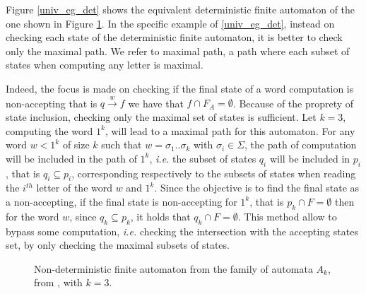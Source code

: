\documentclass[letterpaper]{article}
\theoremstyle{definition}
\begin{document}
Figure \ref{univ_eg_det} shows the equivalent deterministic finite
automaton of the one
shown in Figure \ref{univ_eg_nondet}.
In the specific example of \ref{univ_eg_det}, instead on checking
each state of the deterministic finite automaton, it is
better to check only the maximal path.
We refer to maximal path, a path where each subset of states
when computing any letter is maximal.


Indeed, the focus
is made on checking if the final state of a word computation is
non-accepting that is $q \xrightarrow{w} f$ we have that
 $f \cap F_A = \emptyset$.
Because of the
proprety of state inclusion, checking only the
maximal set of states is sufficient. Let $k=3$, computing the word $1^k$,
will lead to a maximal path for this automaton.
For any word $w < 1^k$
of size $k$ such that $w = \sigma_1..\sigma_k$ with $\sigma_i \in \Sigma$,
the path of computation will be included in the path of $1^k$,
\textit{i.e.} the subset of states $q_i$ will be included
in $p_i$, that is $q_i \subseteq p_i$,
corresponding respectively to the subsets of states
when reading the $i^{th}$ letter of the word $w$ and $1^k$.
Since the objective is to find the final state as a non-accepting,
if the final state is non-accepting for $1^k$,
that is $p_k \cap F = \emptyset$ then for the word $w$,
since $q_k \subseteq p_k$, it holds that $q_k \cap F = \emptyset$.
This method allow to bypass some computation, \textit{i.e.}
checking the intersection with the accepting states set, by only checking
the maximal subsets of states.


\begin{figure}
    \center

    \caption{Non-deterministic finite automaton from the
    family of automata $A_k$,
    from \cite{AC_universality}, with $k=3$.}
    \label{univ_eg_nondet}


\end{figure}
\end{document}
